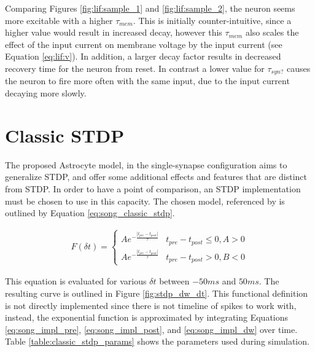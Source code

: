

Comparing Figures \ref{fig:lif:sample_1} and \ref{fig:lif:sample_2}, the
neuron seems more excitable with a higher $\tau_{mem}$. This is initially
counter-intuitive, since a higher value would result in increased decay,
however this $\tau_{mem}$ also scales the effect of the input current on
membrane voltage by the input current (see Equation \ref{eq:lif:v}). In
addition, a larger decay factor results in decreased recovery time for the
neuron from reset. In contrast a lower value for $\tau_{syn?}$ causes the
neuron to fire more often with the same input, due to the input current
decaying more slowly.

\section{Classic STDP} \label{obj1:sec:classic_stdp}
    
The proposed Astrocyte model, in the single-synapse configuration aims to
generalize STDP, and offer some additional effects and features that are
distinct from STDP. In order to have a point of comparison, an STDP
implementation must be chosen to use in this capacity. The chosen model,
referenced by \cite{song_2000} is outlined by Equation
\ref{eq:song_classic_stdp}.

\begin{align}
  F(\delta t) =
  \begin{cases} 
    Ae^{- \frac{|t_{pre}-t_{post}|}{\tau}} & t_{pre} - t_{post} \leq 0, A > 0
    \\ Ae^{- \frac{|t_{pre}-t_{post}|}{\tau}} & t_{pre} - t_{post} > 0, B < 0
  \end{cases} \label{eq:song_classic_stdp}
\end{align}

This equation is evaluated for various $\delta t$ between $-50ms$ and
$50ms$. The resulting curve is outlined in Figure \ref{fig:stdp_dw_dt}. This
functional definition is not directly implemented since there is not timeline of
spikes to work with, instead, the exponential function is approximated by
integrating Equations \ref{eq:song_impl_pre}, \ref{eq:song_impl_post}, and
\ref{eq:song_impl_dw} over time. Table \ref{table:classic_stdp_params} shows the
parameters used during simulation.

